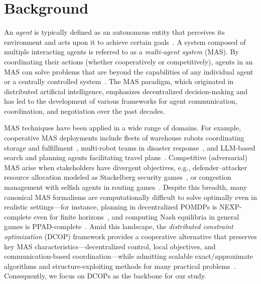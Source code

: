 
\section{Background}



An \textit{agent} is typically defined as an autonomous entity that perceives its environment and acts upon it to achieve certain goals~\citep{Wooldridge2009}. A system composed of multiple interacting agents is referred to as a \textit{multi-agent system} (MAS). By coordinating their actions (whether cooperatively or competitively), agents in an MAS can solve problems that are beyond the capabilities of any individual agent or a centrally controlled system~\citep{Jennings1998}. The MAS paradigm, which originated in distributed artificial intelligence, emphasizes decentralized decision-making and has led to the development of various frameworks for agent communication, coordination, and negotiation over the past decades.

MAS techniques have been applied in a wide range of domains. For example, cooperative MAS deployments include fleets of warehouse robots coordinating storage and fulfillment~\citep{Wurman2008}, multi-robot teams in disaster response~\citep{Parker1998}, and LLM-based search and planning agents facilitating travel plans~\citep{choi2025atlas}. Competitive (adversarial) MAS arise when stakeholders have divergent objectives, e.g., defender–attacker resource allocation modeled as Stackelberg security games~\citep{Tambe2011}, or congestion management with selfish agents in routing games~\citep{Roughgarden2005}. Despite this breadth, many canonical MAS formalisms are computationally difficult to solve optimally even in realistic settings—for instance, planning in decentralized POMDPs is NEXP-complete even for finite horizons~\citep{bernstein2002complexity}, and computing Nash equilibria in general games is PPAD-complete~\citep{daskalakis2009complexity}. Amid this landscape, the \emph{distributed constraint optimization} (DCOP) framework provides a cooperative alternative that preserves key MAS characteristics—decentralized control, local objectives, and communication-based coordination—while admitting scalable exact/approximate algorithms and structure-exploiting methods for many practical problems~\citep{fioretto2018survey}. Consequently, we focus on DCOPs as the backbone for our study.

